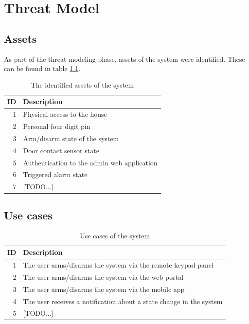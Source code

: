 \chapter{Threat Model} \label{ch:threat-model}
\section{Assets}
As part of the threat modeling phase, assets of the system were identified. These can be found in table \ref{tb:assets}.
\begin{table}[!ht]
    \centering
    \begin{tabular}{r l}
        \hline
        \textbf{ID} & \textbf{Description} \\
        \hline
        1  & Physical access to the house \\
        2  & Personal four digit pin \\
        3  & Arm/disarm state of the system \\
        4  & Door contact sensor state \\
        5  & Authentication to the admin web application \\
        6  & Triggered alarm state \\
        7  & [TODO...] \\
        \hline
    \end{tabular}
    \caption{The identified assets of the system}
    \label{tb:assets}
\end{table}

\section{Use cases}
\begin{table}[!ht]
    \centering
    \begin{tabularx}{\textwidth}{r X}
        \textbf{ID} & \textbf{Description}  \\
        \hline
        1  & The user arms/disarms the system via the remote keypad panel \\
        2  & The user arms/disarms the system via the web portal \\
        3  & The user arms/disarms the system via the mobile app \\
        4  & The user receives a notification about a state change in the system \\
        5  & [TODO...] \\
        \hline
    \end{tabularx}
    \caption{Use cases of the system}
    \label{tb:use-cases}
\end{table}


